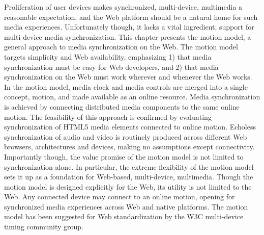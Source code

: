 Proliferation of user devices makes synchronized, multi-device, multimedia
a reasonable expectation, and the Web platform should be a natural home
for such media experiences. Unfortunately though, it lacks a vital ingredient; support for multi-device 
media synchronization. This chapter presents the motion model, a
general approach to media synchronization on the Web. The motion model targets
simplicity and Web availability, emphasizing 1) that media synchronization
must be easy for Web developers, and 2) that media synchronization on the Web
must work wherever and whenever the Web works. In the motion model, media
clock and media controls are merged into a single concept, motion, and made
available as an online resource. Media synchronization is achieved by
connecting distributed media components to the same online motion. The
feasibility of this approach is confirmed by evaluating synchronization of
HTML5 media elements connected to online motion. Echoless synchronization of
audio and video is routinely produced across different Web browsers,
architectures and devices, making no assumptions except connectivity.
Importantly though, the value promise of the motion model is not limited to
synchronization alone. In particular, the extreme flexibility of the motion
model sets it up as a foundation for Web-based, multi-device, multimedia.
Though the motion model is designed explicitly for the Web, its utility is not
limited to the Web. Any connected device may connect to an online motion,
opening for synchronized media experiences across Web and native platforms.
The motion model has been suggested for Web standardization by the W3C multi-device 
timing community group.

